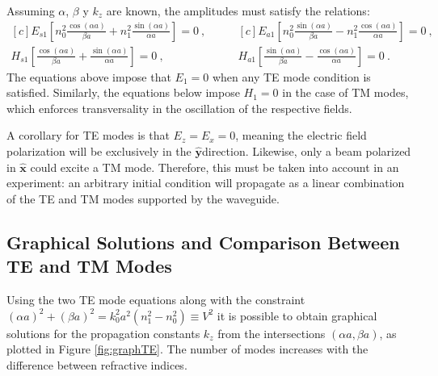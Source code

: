 Assuming $\alpha$, $\beta$ y $k_z$ are known, the amplitudes must satisfy the relations:
\begin{equation*}
	\begin{aligned}[c]
	E_{s1} \left[n_0^2 \frac{\cos(\alpha a)}{\beta a}+n_1 ^2 \frac{\sin(\alpha a)}{\alpha a}\right] = 0 \ ,
		\\
	H_{s1} \left[\frac{\cos(\alpha a)}{\beta a} + \frac{\sin(\alpha a)}{\alpha a} \right] = 0 \ ,
\end{aligned} 
\quad\quad
	\begin{aligned}[c]
	E_{a1} \left[ n_0^2\frac{\sin(\alpha a)}{\beta a} - n_1^2\frac{\cos(\alpha a)}{\alpha a}\right] = 0 \ ,
		\\
	H_{a1} \left[ \frac{\sin(\alpha a)}{\beta a} - \frac{\cos(\alpha a)}{\alpha a}\right] = 0 \ .
\end{aligned} 
\end{equation*}
The equations above impose that $E_1 = 0$ when any TE mode condition is satisfied. Similarly, the equations below impose $H_1 = 0$ in the case of TM modes, which enforces transversality in the oscillation of the respective fields.

A corollary for TE modes is that $E_z = E_x = 0$, meaning the electric field polarization will be exclusively in the $\hat{\textbf{y}}$direction. Likewise, only a beam polarized in $\hat{\textbf{x}}$ could excite a TM mode. Therefore, this must be taken into account in an experiment: an arbitrary initial condition will propagate as a linear combination of the TE and TM modes supported by the waveguide.

\subsection{Graphical Solutions and Comparison Between TE and TM Modes \label{cap:solslabTETM}}

Using the two TE mode equations along with the constraint $(\alpha a)^2 + (\beta a)^2 = k_0^2 a^2(n_1^2 - n_0^2) \equiv V^2$ it is possible to obtain graphical solutions for the propagation constants $k_z$ from the intersections $(\alpha a, \beta a)$, as plotted in Figure \ref{fig:graphTE}. The number of modes increases with the difference between refractive indices.

